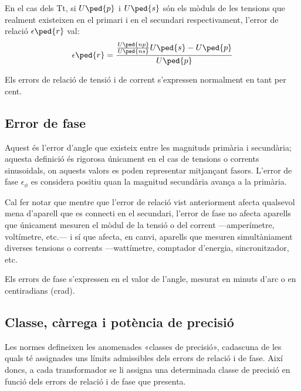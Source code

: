 En el cas dels Tt, si $U\ped{p}$ i $U\ped{s}$ són els mòduls de les tensions que
realment existeixen en el primari i en el secundari respectivament,
l'error de relació $\epsilon\ped{r}$ val:
\begin{equation}
    \epsilon\ped{r} = \frac{\frac{U\ped{np}}{U\ped{ns}} U\ped{s} - U\ped{p}} {U\ped{p}}
\end{equation}

Els errors de relació de tensió i de corrent s'expressen
normalment en tant per cent.

\subsection{Error de fase}

Aquest és l'error d'angle  que existeix entre les magnituds primària i
secundària; aquesta definició és rigorosa únicament en el cas de
tensions o corrents sinusoidals, on aquests valors es poden
representar mitjançant fasors. L'error de fase $\epsilon_\phi$ es considera positiu quan la magnitud secundària avança a la primària.
\index{$\epsilon_\phi$}

 Cal fer notar que mentre que l'error de relació
vist anteriorment afecta qualsevol mena d'aparell que es
connecti en el secundari, l'error de fase no afecta aparells que
únicament mesuren el mòdul de la tensió o del corrent ---amperímetre,
voltímetre, etc.--- i sí que afecta, en canvi, aparells que mesuren
simultàniament diverses tensions o corrents ---wattímetre, comptador
d'energia, sincronitzador, etc.

Els errors de fase s'expressen en el valor de l'angle, mesurat en
minuts d'arc o en centiradians (crad).

\subsection{Classe, càrrega i potència de precisió}

Les normes defineixen les anomenades «classes de precisió»,
cadascuna de les quals té assignades uns límits admissibles dels
errors de relació i de fase. Així doncs, a cada transformador
se li assigna una determinada classe de precisió en funció dels errors
de relació i de fase que presenta.

